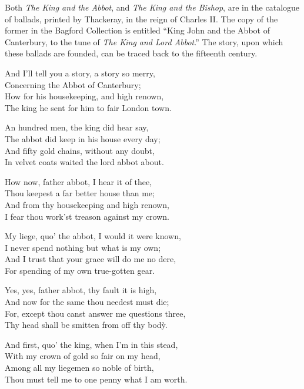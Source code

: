Both \textit{The King and the Abbot}, and \textit{The King and the Bishop}, are in the
catalogue of ballads, printed by Thackeray, in the reign of Charles II. The
copy of the former in the Bagford Collection is entitled “King John and the
Abbot of Canterbury, to the tune of \textit{The King and Lord Abbot}.” The story,
upon which these ballads are founded, can be traced back to the fifteenth
century.


\bigskip


\pagebreak

\settowidth{\versewidth}{—Now from the third question thou must not shrink,}
\begin{dcverse}\footnotesizerr
And I’ll tell you a story, a story so merry,\\
Concerning the Abbot of Canterbury;\\
How for his housekeeping, and high renown,\\
The king he sent for him to fair London town.

An hundred men, the king did hear say,\\
The abbot did keep in his house every day;\\
And fifty gold chains, without any doubt,\\
In velvet coats waited the lord abbot about.

How now, father abbot, I hear it of thee,\\
Thou keepest a far better house than me;\\
And from thy housekeeping and high renown,\\
I fear thou work’st treason against my crown.

My liege, quo’ the abbot, I would it were known,\\
I never spend nothing but what is my own;\\
And I trust that your grace will do me no dere,\\
For spending of my own true-gotten gear.

Yes, yes, father abbot, thy fault it is high,\\
And now for the same thou needest must die;\\
For, except thou canst answer me questions three,\\
Thy head shall be smitten from off thy bodỳ.

And first, quo’ the king, when I’m in this stead,\\
With my crown of gold so fair on my head,\\
Among all my liegemen so noble of birth,\\
Thou must tell me to one penny what I am worth.


\end{dcverse}
